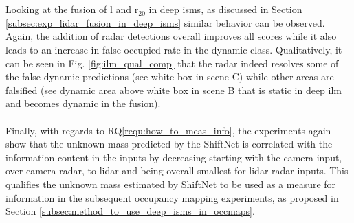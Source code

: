 \\\\
Looking at the fusion of \gls{l} and \gls{r}$_{20}$ in deep \gls{ism}s, as discussed in Section \ref{subsec:exp_lidar_fusion_in_deep_isms} similar behavior can be observed. Again, the addition of radar detections overall improves all scores while it also leads to an increase in false occupied rate in the dynamic class. Qualitatively, it can be seen in Fig. \ref{fig:ilm_qual_comp} that the radar indeed resolves some of the false dynamic predictions (see white box in scene C) while other areas are falsified (see dynamic area above white box in scene B that is static in deep \gls{ilm} and becomes dynamic in the fusion).
\\\\
Finally, with regards to RQ\ref{requ:how_to_meas_info}, the experiments again show that the unknown mass predicted by the ShiftNet is correlated with the information content in the inputs by decreasing starting with the camera input, over camera-radar, to lidar and being overall smallest for lidar-radar inputs. This qualifies the unknown mass estimated by ShiftNet to be used as a measure for information in the subsequent occupancy mapping experiments, as proposed in Section \ref{subsec:method_to_use_deep_isms_in_occmaps}.